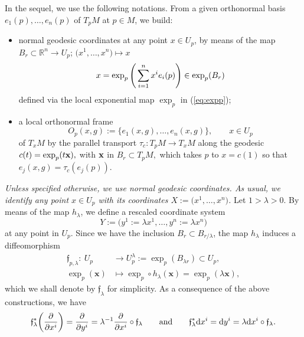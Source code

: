 \documentclass[10pt,a4paper]{amsart}
\numberwithin{equation}{section}
\theoremstyle{definition}
\newcommand{\R}{\mathbb R}
\begin{document}
In the sequel, we use the following notations. From a given orthonormal basis $e_1(p), \dots,\allowbreak e_n(p)$ of $T_pM$ at $p\in M$, we build:
\begin{itemize}\itemsep=0pt
	\item normal geodesic coordinates at any point $x\in U_p$, by means of the map $ {B}_r\subset\R^n\to U_p$; $\bigl(x^1,\dots,x^n\bigr)\mapsto x$
\begin{equation}\label{eq:geodesiccoord}
x=\exp_p\Bigg(\sum_{i=1}^n x^i e_i(p)\Bigg)\in {\rm exp}_p(B_r)
\end{equation}
	 defined via the local exponential map $\exp_p$ in (\ref{eq:expp});
	\item a local orthonormal frame
\begin{equation}\label{eq:Op}
O_p(x, g):=\{e_1(x, g),\dots,e_n(x, g)\},\qquad x\in U_p
\end{equation}
of $T_xM$ by the parallel transport $\tau_{c}\colon T_pM\to T_xM$ along the geodesic $c(t)= \exp_p(t {\bf x}), $ with $ {\bf x}$ in $B_r\subset T_pM,$ which takes $p$ to $x= c(1)$ so that $e_j(x, g)=\tau_{c} (e_j(p))$.
\end{itemize}

{\it Unless specified otherwise, we use normal geodesic coordinates. As usual, we identify any point $x\in U_p$ with its coordinates $X:=\bigl(x^1,\dots, x^n\bigr)$.} Let $1>\lambda>0$. By means of the map $h_\lambda$,
 we define a rescaled coordinate system
\begin{equation*}
	Y:=\bigl(y^1:= \lambda x^1, \dots, y^n:= \lambda x^n\bigr)
\end{equation*}
at any point in $U_p$. Since
we have the inclusion $ {B_r \subset B_{r/\lambda}}$, the map $h_\lambda$
 induces a diffeomorphism
 \begin{align}
 {\mathfrak f}_{p,\lambda}\colon \ U_{p} &\longrightarrow U_{p}^\lambda:=\exp_p(B_{\lambda r})\subset U_p,\nonumber\\
	 \exp_{p}({\mathbf x})&\longmapsto \exp_p\circ h_\lambda( {\mathbf x})= \exp_{p}( \lambda {\mathbf x}),\label{eq:flambdaUplambda}
\end{align}
which we shall denote by ${\mathfrak f}_\lambda$ for simplicity. As a consequence of the above constructions, we have
\begin{gather}
\mathfrak{f}_\lambda^*\biggl(\frac{\partial}{\partial x^{i}}\biggr)=\frac{\partial}{\partial y^i}=\lambda^{-1} \frac{\partial}{\partial x^{i}}\circ \mathfrak{f}_\lambda \qquad\text{and}\qquad \mathfrak{f}_\lambda^* {\rm d}x^i={\rm d}y^i=\lambda {\rm d}x^i\circ \mathfrak{f}_\lambda.\label{eq:derivativedifferent}
\end{gather}
\end{document}
